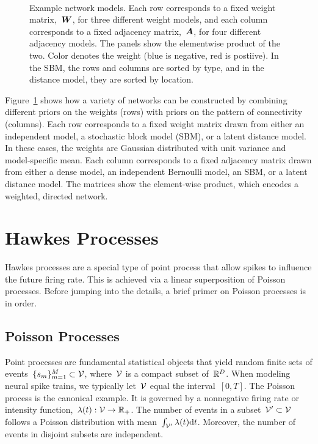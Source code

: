 \begin{figure}[t!]
\begin{subfigure}[b]{1.10in}
  \end{subfigure}
  \\
  \vspace{-.1in}
  \caption[Examples of network models]{Example network models.  Each
    row corresponds to a fixed weight matrix,~$\boldsymbol{W}$, for three
    different weight models, and each column corresponds to a fixed
    adjacency matrix,~$\boldsymbol{A}$, for four different adjacency models. The
    panels show the elementwise product of the two. Color denotes the
    weight (blue is negative, red is postiive).  In the SBM, the rows
    and columns are sorted by type, and in the distance model, they
    are sorted by location. }
  \label{fig:network_models}
\end{figure}

Figure~\ref{fig:network_models} shows how a variety of networks can be
constructed by combining different priors on the weights (rows) with
priors on the pattern of connectivity (columns). Each row corresponds
to a fixed weight matrix drawn from either an independent model, a
stochastic block model (SBM), or a latent distance model. In these
cases, the weights are Gaussian distributed with unit variance and
model-specific mean. Each column corresponds to a fixed adjacency
matrix drawn from either a dense model, an independent
Bernoulli model, an SBM, or a latent distance model. The matrices show
the element-wise product, which encodes a weighted, directed
network. 


\section{Hawkes Processes}
\label{sec:hawkes_processes}
Hawkes processes \cite{Hawkes-1971} are a special type of point process
that allow spikes to influence the future firing rate. This is achieved
via a linear superposition of Poisson processes. Before jumping into the
details, a brief primer on Poisson processes is in order.

\subsection{Poisson Processes}
\sloppy Point processes are fundamental statistical objects that yield
random finite sets of events~${\{s_m\}_{m=1}^M \subset \mathcal{V}}$,
where~$\mathcal{V}$ is a compact subset of~${\mathbb{R}^D}$.  When modeling
neural spike trains, we typically let~${\mathcal{V}}$ equal the
interval~${[0,T]}$. The Poisson process is the canonical example. It
is governed by a nonnegative firing rate or intensity
function,~${\lambda(t): \mathcal{V} \rightarrow\mathbb{R}_+}$. The number of
events in a subset~${\mathcal{V}'\subset\mathcal{V}}$ follows a Poisson distribution
with mean~${\int_{\mathcal{V}'}\lambda(t)\mathrm{d}t}$. Moreover, the number
of events in disjoint subsets are independent.

